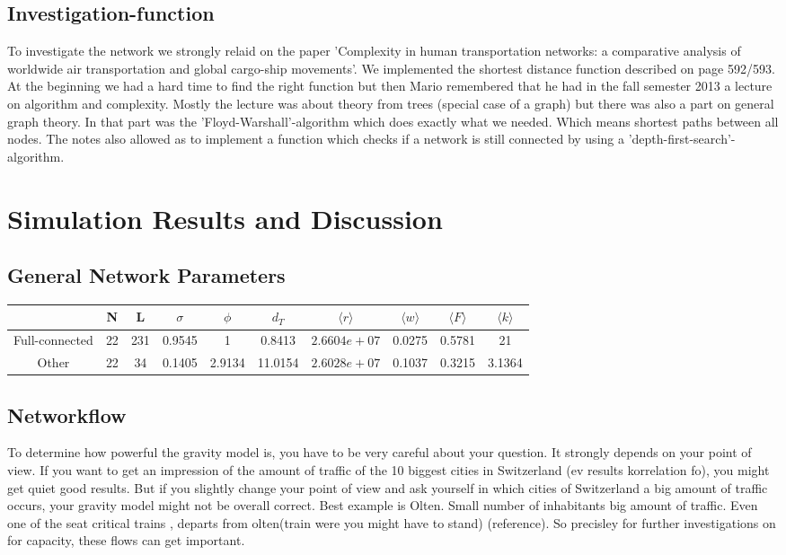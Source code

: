 \documentclass[11pt]{article}
\begin{document}
\subsection{Investigation-function}
To investigate the network we strongly relaid on the paper 'Complexity in human transportation networks: a comparative analysis of worldwide air transportation and global cargo-ship movements'.
We implemented the shortest distance function described on page 592/593. At the beginning we had a hard time to find the right function but then Mario remembered that he had in the fall semester 2013 a lecture on algorithm and complexity. Mostly the lecture was about theory from trees (special case of a graph) but there was also a part on general graph theory. In that part was the 'Floyd-Warshall'-algorithm which does exactly what we needed. Which means shortest paths between all nodes.
The notes also allowed as to implement a function which checks if a network is still connected by using a 'depth-first-search'-algorithm.




\section{Simulation Results and Discussion}

\subsection{General Network Parameters}
\begin{tabular}{c|c|c|c|c|c|c|c|c|c|}
 & N & L & $\sigma$ & $\phi$ & $d_T$ & $\langle r\rangle$ & 
 $\langle w\rangle$ & $\langle F\rangle$&$\langle k\rangle$ \\\hline
 Full-connected & 22 & 231 &0.9545&1& 0.8413& $2.6604e+07$&0.0275&0.5781& 21\\\hline
 
 Other & 22 & 34 &    0.1405&2.9134& 11.0154&$2.6028e+07$&0.1037&0.3215& 3.1364\\\hline
\end{tabular}


\subsection{Networkflow}

To determine how powerful the gravity model is, you have to be very careful about your question. It strongly depends on your point of view. If you want to get an impression of the amount of traffic of the 10 biggest cities in Switzerland (ev results korrelation fo), you might get quiet good results. But if you slightly change your point of view and ask yourself in which cities of Switzerland a big amount of traffic occurs, your gravity model might not be overall correct. Best example is Olten. Small number of inhabitants big amount of traffic. Even one of the seat critical trains , departs from olten(train were you might have to stand) (reference). So precisley for further investigations on for capacity, these flows can get important.
\end{document}
